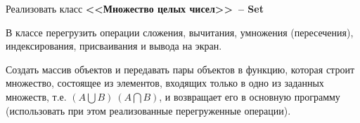 Реализовать класс \textbf{<<Множество целых чисел>>~-- Set}

В классе перегрузить операции сложения, вычитания,
умножения (пересечения), индексирования, присваивания и вывода на экран.

Создать
массив объектов и передавать пары объектов в функцию, которая строит множество,
состоящее из элементов, входящих только в одно из заданных множеств, 
т.е. $(A\bigcup B) \ (A\bigcap B)$, и возвращает его в основную программу (использовать при этом
реализованные перегруженные операции).

